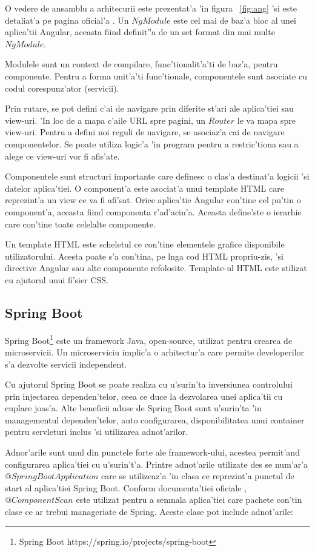 \documentclass[12pt,a4paper,twoside]{report}
\begin{document}
O vedere de ansamblu a arhitecurii este prezentat'a 'in figura ~\ref{fig:ang} 'si este detaliat'a pe pagina oficial'a \cite{AngularCite}. Un $NgModule$ este cel mai de baz'a bloc al unei aplica'tii Angular, aceasta fiind definit''a de un set format din mai multe $NgModule$.

Modulele sunt un context de compilare, func'tionalit'a'ti de baz'a, pentru componente. Pentru a forma unit'a'ti func'tionale, componentele sunt asociate cu codul corespunz'ator (servicii).

Prin rutare, se pot defini c'ai de navigare prin diferite st'ari ale aplica'tiei sau view-uri. 'In loc de a mapa c'aile URL spre pagini, un $Router$ le va mapa spre view-uri. Pentru a defini noi reguli de navigare, se asociaz'a cai de navigare componentelor. Se poate utiliza logic'a 'in program pentru a restric'tiona sau a alege ce view-uri vor fi afis'ate.

Componentele sunt structuri importante care definesc o clas'a destinat'a logicii 'si datelor aplica'tiei. O component'a este asociat'a unui template HTML care reprezint'a un view ce va fi afi'sat. Orice aplica'tie Angular con'tine cel pu'tin o component'a, aceasta fiind componenta r'ad'acin'a. Aceasta define'ste o ierarhie care con'tine toate celelalte componente.

Un template HTML este scheletul ce con'tine elementele grafice disponibile utilizatorului. Acesta poate s'a con'tina, pe l\ia nga cod HTML propriu-zis, 'si directive Angular sau alte componente refolosite. Template-ul HTML este stilizat cu ajutorul unui fi'sier CSS.

\subsection{Spring Boot}
Spring Boot\footnote{Spring Boot https://spring.io/projects/spring-boot} este un framework Java, open-source, utilizat pentru crearea de microservicii. Un microserviciu implic'a o arhitectur'a care permite developerilor s'a dezvolte servicii independent.

Cu ajutorul Spring Boot se poate realiza cu u'surin'ta inversiunea controlului prin injectarea dependen'telor, ceea ce duce la dezvolarea unei aplica'tii cu cuplare joas'a. Alte beneficii aduse de Spring Boot sunt u'surin'ta 'in managementul dependen'telor, auto configurarea, disponibilitatea unui container pentru servleturi inclus 'si utilizarea adnot'arilor.

Adnor'arile sunt unul din punctele forte ale framework-ului, acestea permit'and configurarea aplica'tiei cu u'surin't'a. Printre adnot'arile utilizate des se num'ar'a $@SpringBootApplication$ care se utilizeaz'a 'in clasa ce reprezint'a punctul de start al aplica'tiei Spring Boot. Conform documenta'tiei oficiale \cite{springBootCite}, $@ComponentScan$ este utilizat pentru a semnala aplica'tiei care pachete con'tin clase ce ar trebui manageriate de Spring. Aceste clase pot include adnot'arile: 
\end{document}
